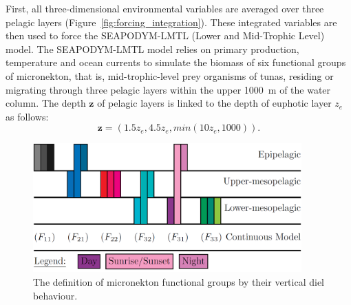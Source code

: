 First, all three-dimensional environmental variables are averaged over three pelagic layers (Figure~\ref{fig:forcing_integration}). These integrated variables are then used to force the SEAPODYM-LMTL (Lower and Mid-Trophic Level) model. The SEAPODYM-LMTL model relies on primary production, temperature and ocean currents to simulate the biomass of six functional groups of micronekton, that is, mid-trophic-level prey organisms of tunas, residing or migrating through three pelagic layers within the upper 1000~m of the water column. The depth $\mathbf{z}$ of pelagic layers is linked to the depth of euphotic layer $z_e$ as follows: 
\begin{equation}\label{eq:pelagic-layers}
\mathbf{z}=(1.5 z_e,4.5 z_e,min(10 z_e,1000)). 
\end{equation}

\begin{figure}[H]
\centering
 \includegraphics[width=0.92\textwidth]{chapter1/figs/mnk-groups}
 \caption{The definition of micronekton functional groups by their vertical diel behaviour. }
 \label{fig:mnk_groups}
\end{figure}

